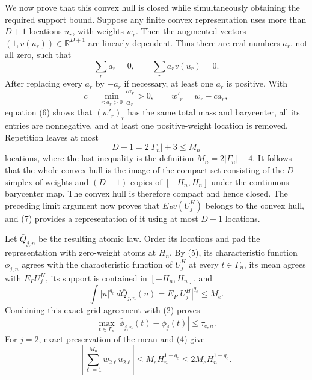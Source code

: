 We now prove that this convex hull is closed while simultaneously obtaining
the required support bound.  Suppose any finite convex representation uses
more than \(D+1\) locations \(u_r\), with weights \(w_r\).
Then the augmented vectors \((1,v(u_r))\in\mathbb R^{D+1}\) are linearly
dependent.  Thus there are real numbers \(a_r\), not all zero, such that
\[
 \sum_r a_r=0,
 \qquad
 \sum_r a_rv(u_r)=0.                                               \tag{6}
\]
After replacing every \(a_r\) by \(-a_r\) if necessary, at least one
\(a_r\) is positive.  With
\[
 c=\min_{r:a_r>0}\frac{w_r}{a_r}>0,
 \qquad
 w'_r=w_r-ca_r,
\]
equation (6) shows that \((w'_r)_r\) has the same total mass and barycenter,
all its entries are nonnegative, and at least one positive-weight location is
removed.  Repetition leaves at most
\[
 D+1=2|\Gamma_n|+3\le M_n                                         \tag{7}
\]
locations, where the last inequality is the definition
\(M_n=2|\Gamma_n|+4\).  It follows that the whole convex hull is the image of
the compact set consisting of the \(D\)-simplex of weights and
\((D+1)\) copies of \([-H_n,H_n]\) under the continuous barycenter map.
The convex hull is therefore compact and hence closed.  The preceding limit
argument now proves that \(E_Pv(U_j^H)\) belongs to the convex hull, and (7)
provides a representation of it using at most \(D+1\) locations.

Let \(\bar Q_{j,n}\) be the resulting atomic law.  Order its locations and
pad the representation with zero-weight atoms at \(H_n\).  By (5), its
characteristic function \(\bar\phi_{j,n}\) agrees with the characteristic
function of \(U_j^H\) at every \(t\in\Gamma_n\), its mean agrees with
\(E_PU_j^H\), its support is contained in \([-H_n,H_n]\), and
\[
 \int |u|^{q_e}\,d\bar Q_{j,n}(u)
 =E_P|U_j^H|^{q_e}\le M_e.                                        \tag{8}
\]
Combining this exact grid agreement with (2) proves
\[
 \max_{t\in\Gamma_n}
 |\bar\phi_{j,n}(t)-\phi_j(t)|
 \le\tau_{e,n}.                                                    \tag{9}
\]
For \(j=2\), exact preservation of the mean and (4) give
\[
 \left|\sum_{\ell=1}^{M_n}w_{2\ell}u_{2\ell}\right|
 \le M_eH_n^{1-q_e}
 \le2M_eH_n^{1-q_e}.                                              \tag{10}
\]

